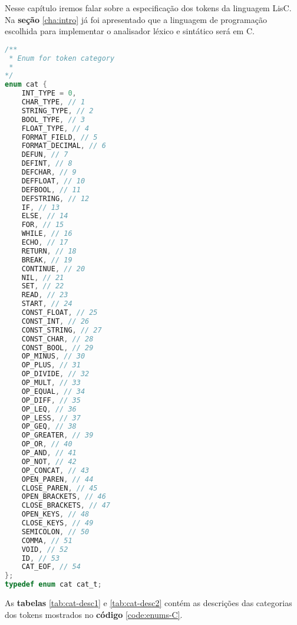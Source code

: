 \documentclass[
  12pt,				%
  oneside,			%
  a4paper,			%
  english,			%
  french,				%
  spanish,			%
  brazil,				%
]{abntex2}
\begin{document}
Nesse capítulo iremos falar sobre a especificação dos tokens da
linguagem LisC. Na \textbf{seção} \ref{cha:intro} já foi apresentado
que a linguagem de programação escolhida para implementar o analisador
léxico e sintático será em C.


\begin{lstlisting}[label=code:enums-C,caption=Enumeração das
    categorias dos tokens,language=C]
/**
 * Enum for token category
 *
*/
enum cat {
    INT_TYPE = 0,
    CHAR_TYPE, // 1
    STRING_TYPE, // 2
    BOOL_TYPE, // 3
    FLOAT_TYPE, // 4
    FORMAT_FIELD, // 5
    FORMAT_DECIMAL, // 6
    DEFUN, // 7
    DEFINT, // 8
    DEFCHAR, // 9
    DEFFLOAT, // 10
    DEFBOOL, // 11
    DEFSTRING, // 12
    IF, // 13
    ELSE, // 14
    FOR, // 15
    WHILE, // 16
    ECHO, // 17
    RETURN, // 18
    BREAK, // 19
    CONTINUE, // 20
    NIL, // 21
    SET, // 22
    READ, // 23
    START, // 24
    CONST_FLOAT, // 25
    CONST_INT, // 26
    CONST_STRING, // 27
    CONST_CHAR, // 28
    CONST_BOOL, // 29
    OP_MINUS, // 30
    OP_PLUS, // 31
    OP_DIVIDE, // 32
    OP_MULT, // 33
    OP_EQUAL, // 34
    OP_DIFF, // 35
    OP_LEQ, // 36
    OP_LESS, // 37
    OP_GEQ, // 38
    OP_GREATER, // 39
    OP_OR, // 40
    OP_AND, // 41
    OP_NOT, // 42
    OP_CONCAT, // 43
    OPEN_PAREN, // 44
    CLOSE_PAREN, // 45
    OPEN_BRACKETS, // 46
    CLOSE_BRACKETS, // 47
    OPEN_KEYS, // 48
    CLOSE_KEYS, // 49
    SEMICOLON, // 50
    COMMA, // 51
    VOID, // 52
    ID, // 53
    CAT_EOF, // 54
};
typedef enum cat cat_t;


\end{lstlisting}

As \textbf{tabelas} \ref{tab:cat-desc1} e \ref{tab:cat-desc2}
contém as descrições das categorias dos tokens mostrados no
\textbf{código} \ref{code:enums-C}.
\end{document}
